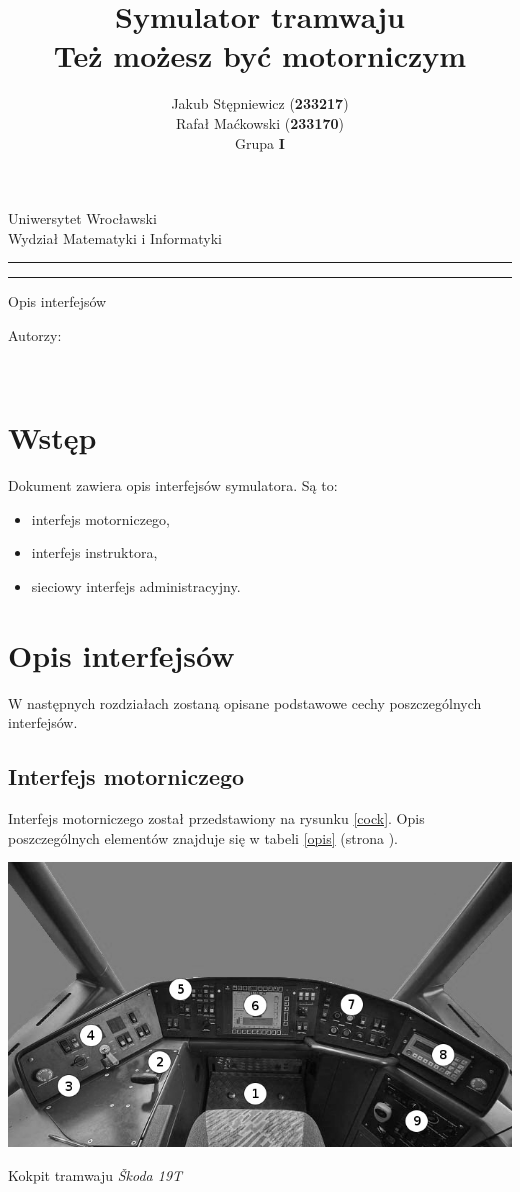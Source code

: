 \documentclass[12pt,a4paper]{article}
\author{Jakub Stępniewicz (\textbf{233217})\\Rafał Maćkowski (\textbf{233170})\\Grupa {\bf I}}
\title{Symulator tramwaju\\ \small{Też możesz być motorniczym}}
\makeatletter
\newcommand{\linia}{\rule{\linewidth}{0.4mm}}
\renewcommand{\maketitle}{\begin{titlepage}
		\vspace*{1cm}
    \begin{center}\small
    	Uniwersytet Wrocławski\\
    	Wydział Matematyki i Informatyki\\
    \end{center}
    \vspace{3cm}
    \noindent
    \linia
    \begin{center}
    	\LARGE{\textsc{\@title}}
         \end{center}
     \linia
    \begin{center}
    	\Large{Opis interfejsów}
         \end{center}
    \vspace{0.5cm}

    \begin{flushright}

    \begin{minipage}{5.5cm}

    	\small Autorzy:

    \normalsize {\@author} \par
    

    \end{minipage}
    \vspace{5cm}

     

     \end{flushright}

    \vspace*{\stretch{6}}

    \begin{center}

    \@date\\

    \end{center}

  \end{titlepage}%

}
\makeatother
\begin{document}
\maketitle
\tableofcontents
\vspace{5cm}
\newpage
% 

\section{Wstęp}
Dokument zawiera opis interfejsów symulatora. Są to:
\begin{itemize}
\item interfejs motorniczego,
\item interfejs instruktora,
\item sieciowy interfejs administracyjny.
\end{itemize}
\section{Opis interfejsów}
W następnych rozdziałach zostaną opisane podstawowe cechy poszczególnych interfejsów.
\subsection{Interfejs motorniczego}
Interfejs motorniczego został przedstawiony na rysunku \ref{cock}. Opis poszczególnych elementów znajduje się w tabeli \ref{opis} (strona \pageref{opis}).
\begin{image}[p!]
	\begin{center}
		\includegraphics[bb=0 0 700 396]{img/cockNUM.jpg}
		\caption{Kokpit tramwaju {\it Škoda 19T}}
			\label{cock}
	\end{center}
\end{image}
\end{document}
